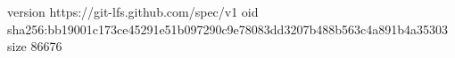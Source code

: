 version https://git-lfs.github.com/spec/v1
oid sha256:bb19001c173ce45291e51b097290c9e78083dd3207b488b563c4a891b4a35303
size 86676
